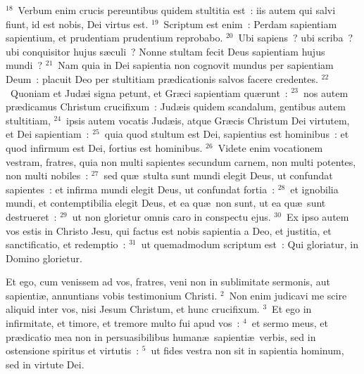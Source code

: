 ${}^{18}$~Verbum enim crucis pereuntibus quidem stultitia est~: iis autem qui salvi fiunt, id est nobis, Dei virtus est.
${}^{19}$~Scriptum est enim~: Perdam sapientiam sapientium, et prudentiam prudentium reprobabo.
${}^{20}$~Ubi sapiens~? ubi scriba~? ubi conquisitor hujus s\ae culi~? Nonne stultam fecit Deus sapientiam hujus mundi~?
${}^{21}$~Nam quia in Dei sapientia non cognovit mundus per sapientiam Deum~: placuit Deo per stultitiam pr\ae dicationis salvos facere credentes.
${}^{22}$~Quoniam et Jud\ae i signa petunt, et Gr\ae ci sapientiam qu\ae runt~:
${}^{23}$~nos autem pr\ae dicamus Christum crucifixum~: Jud\ae is quidem scandalum, gentibus autem stultitiam,
${}^{24}$~ipsis autem vocatis Jud\ae is, atque Gr\ae cis Christum Dei virtutem, et Dei sapientiam~:
${}^{25}$~quia quod stultum est Dei, sapientius est hominibus~: et quod infirmum est Dei, fortius est hominibus.
${}^{26}$~Videte enim vocationem vestram, fratres, quia non multi sapientes secundum carnem, non multi potentes, non multi nobiles~:
${}^{27}$~sed qu\ae\ stulta sunt mundi elegit Deus, ut confundat sapientes~: et infirma mundi elegit Deus, ut confundat fortia~:
${}^{28}$~et ignobilia mundi, et contemptibilia elegit Deus, et ea qu\ae\ non sunt, ut ea qu\ae\ sunt destrueret~:
${}^{29}$~ut non glorietur omnis caro in conspectu ejus.
${}^{30}$~Ex ipso autem vos estis in Christo Jesu, qui factus est nobis sapientia a Deo, et justitia, et sanctificatio, et redemptio~:
${}^{31}$~ut quemadmodum scriptum est~: Qui gloriatur, in Domino glorietur.

\lettrine[lines=3,image=true,loversize=0.05,lraise=-0.03]{E}{}t ego, cum venissem ad vos, fratres, veni non in sublimitate sermonis, aut sapienti\ae , annuntians vobis testimonium Christi.
${}^{2}$~Non enim judicavi me scire aliquid inter vos, nisi Jesum Christum, et hunc crucifixum.
${}^{3}$~Et ego in infirmitate, et timore, et tremore multo fui apud vos~:
${}^{4}$~et sermo meus, et pr\ae dicatio mea non in persuasibilibus human\ae\ sapienti\ae\ verbis, sed in ostensione spiritus et virtutis~:
${}^{5}$~ut fides vestra non sit in sapientia hominum, sed in virtute Dei.


